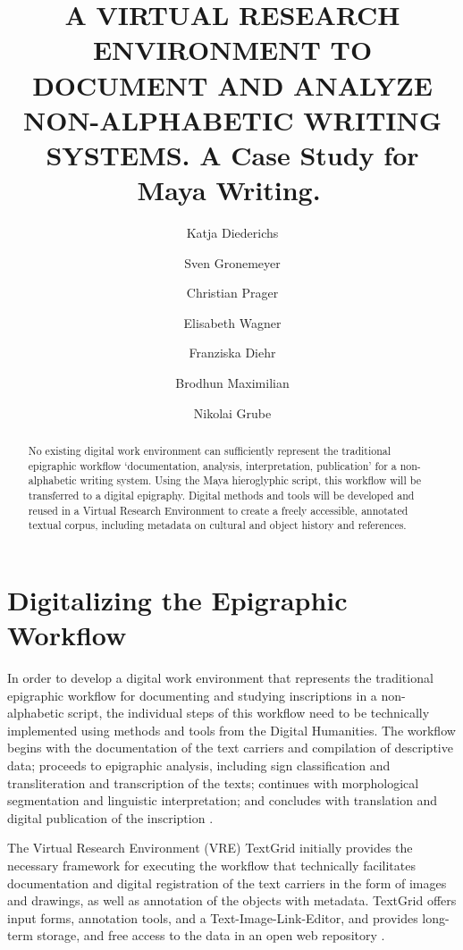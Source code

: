 \documentclass[amsthm,ebook]{saparticle}
\title{A VIRTUAL RESEARCH ENVIRONMENT TO DOCUMENT AND ANALYZE NON-ALPHABETIC WRITING SYSTEMS. A Case Study for Maya Writing.}
\author[bonn]{Katja Diederichs\corref{first}}
\author[bonn]{Sven Gronemeyer}
\author[bonn]{Christian Prager}
\author[bonn]{Elisabeth Wagner}
\author[bonn]{Franziska Diehr}
\author[bonn]{Brodhun Maximilian}
\author[bonn]{Nikolai Grube}
\begin{document}
\maketitle

\begin{abstract}
No existing digital work environment can sufficiently represent the traditional epigraphic workflow `documentation,
analysis, interpretation, publication' for a non-alphabetic writing system. Using the Maya hieroglyphic script, this
workflow will be transferred to a digital epigraphy. Digital methods and tools will be developed and reused in a
Virtual Research Environment to create a freely accessible, annotated textual corpus, including metadata on cultural
and object history and references.
\end{abstract}







\section{Digitalizing the Epigraphic Workflow}


\noindent In order to develop a digital work environment that represents the traditional epigraphic workflow for documenting and
studying inscriptions in a non-alphabetic script, the individual steps of this workflow need to be technically
implemented using methods and tools from the Digital Humanities. The workflow begins with the documentation of the text
carriers and compilation of descriptive data; proceeds to epigraphic analysis, including sign classification and
transliteration and transcription of the texts; continues with morphological segmentation and linguistic
interpretation; and concludes with translation and digital publication of the inscription \citep{Diederichs2015}. 

The Virtual Research Environment (VRE) TextGrid initially provides the necessary framework for executing the workflow
that technically facilitates documentation and digital registration of the text carriers in the form of images and
drawings, as well as annotation of the objects with metadata. TextGrid offers input forms, annotation tools, and a
Text-Image-Link-Editor, and provides long-term storage, and free access to the data in an open web repository \citep{NeurothLohmeier2011}. 
\end{document}
